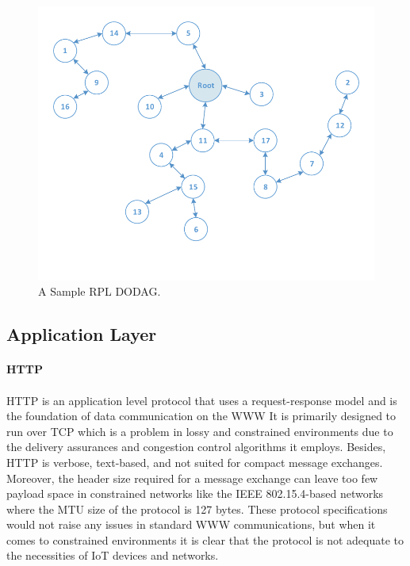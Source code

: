 \begin{figure}[h!]
  \centering
  \includegraphics[width=1.0\linewidth]{figures/RPL_DODAG.pdf}
  \caption{A Sample RPL DODAG.}
  \label{fig:rpl_dodag}
\end{figure}

\subsection{Application Layer}

\paragraph{\textbf{\gls{HTTP}}}
\paragraph{}
	\gls{HTTP} is an application level protocol that uses a request-response model and is the foundation of data communication on the \gls{WWW} It is primarily designed to run over \gls{TCP} which is a problem in lossy and constrained environments due to the delivery assurances and congestion control algorithms it employs. Besides, {HTTP} is verbose, text-based, and not suited for compact message exchanges. Moreover, the header size required for a message exchange can leave too few payload space in constrained networks like the IEEE 802.15.4-based networks where the \gls{MTU} size of the protocol is 127 bytes. These protocol specifications would not raise any issues in standard \gls{WWW} communications, but when it comes to constrained environments it is clear that the protocol is not adequate to the necessities of \gls{IoT} devices and networks.

